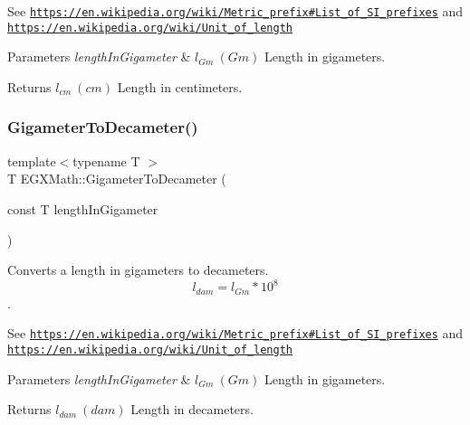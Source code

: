 See \href{https://en.wikipedia.org/wiki/Metric_prefix#List_of_SI_prefixes}{\tt https\+://en.\+wikipedia.\+org/wiki/\+Metric\+\_\+prefix\#\+List\+\_\+of\+\_\+\+S\+I\+\_\+prefixes} and \href{https://en.wikipedia.org/wiki/Unit_of_length}{\tt https\+://en.\+wikipedia.\+org/wiki/\+Unit\+\_\+of\+\_\+length} 
\begin{DoxyParams}{Parameters}
{\em length\+In\+Gigameter} & $ l_{Gm}\ (Gm)$ Length in gigameters. \\
\hline
\end{DoxyParams}
\begin{DoxyReturn}{Returns}
$ l_{cm}\ (cm)$ Length in centimeters. 
\end{DoxyReturn}
\mbox{\label{group___e_g_x_math-_conversions-_length_conversions-_gigameter-_s_i_gab0233167d63c136801ae42faabe64263}} 
\subsubsection{\texorpdfstring{Gigameter\+To\+Decameter()}{GigameterToDecameter()}}
{\footnotesize\ttfamily template$<$typename T $>$ \\
T E\+G\+X\+Math\+::\+Gigameter\+To\+Decameter (\begin{DoxyParamCaption}\item[{const T}]{length\+In\+Gigameter }\end{DoxyParamCaption})}



Converts a length in gigameters to decameters. \[ l_{dam}=l_{Gm} * 10^{8} \]. 

See \href{https://en.wikipedia.org/wiki/Metric_prefix#List_of_SI_prefixes}{\tt https\+://en.\+wikipedia.\+org/wiki/\+Metric\+\_\+prefix\#\+List\+\_\+of\+\_\+\+S\+I\+\_\+prefixes} and \href{https://en.wikipedia.org/wiki/Unit_of_length}{\tt https\+://en.\+wikipedia.\+org/wiki/\+Unit\+\_\+of\+\_\+length} 
\begin{DoxyParams}{Parameters}
{\em length\+In\+Gigameter} & $ l_{Gm}\ (Gm)$ Length in gigameters. \\
\hline
\end{DoxyParams}
\begin{DoxyReturn}{Returns}
$ l_{dam}\ (dam)$ Length in decameters. 
\end{DoxyReturn}
\mbox{\label{group___e_g_x_math-_conversions-_length_conversions-_gigameter-_s_i_ga9333dddd3642cf160b026516dd760576}} 
